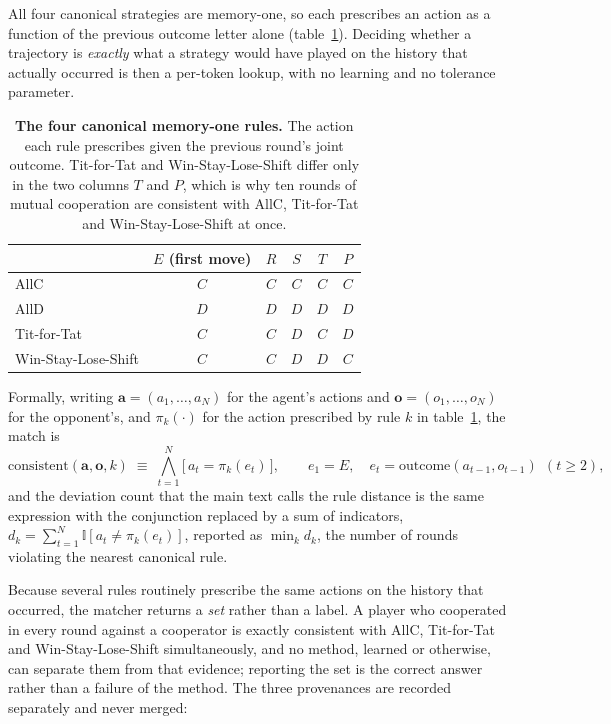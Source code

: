 \documentclass[11pt,a4paper]{article}
\begin{document}
All four canonical strategies are memory-one, so each prescribes an action as a function of the previous outcome letter alone (table~\ref{tab:A-rules}). Deciding whether a trajectory is \emph{exactly} what a strategy would have played on the history that actually occurred is then a per-token lookup, with no learning and no tolerance parameter.

\begin{table}[htbp]
\centering
\footnotesize
\caption{\textbf{The four canonical memory-one rules.} The action each rule prescribes given the previous round's joint outcome. Tit-for-Tat and Win-Stay-Lose-Shift differ only in the two columns $T$ and $P$, which is why ten rounds of mutual cooperation are consistent with AllC, Tit-for-Tat and Win-Stay-Lose-Shift at once.}
\label{tab:A-rules}
\begin{tabular}{@{}lccccc@{}}
\toprule
& $E$ (first move) & $R$ & $S$ & $T$ & $P$ \\
\midrule
AllC & $C$ & $C$ & $C$ & $C$ & $C$ \\
AllD & $D$ & $D$ & $D$ & $D$ & $D$ \\
Tit-for-Tat & $C$ & $C$ & $D$ & $C$ & $D$ \\
Win-Stay-Lose-Shift & $C$ & $C$ & $D$ & $D$ & $C$ \\
\bottomrule
\end{tabular}
\end{table}

Formally, writing $\mathbf{a} = (a_1, \ldots, a_N)$ for the agent's actions and $\mathbf{o} = (o_1, \ldots, o_N)$ for the opponent's, and $\pi_k(\cdot)$ for the action prescribed by rule $k$ in table~\ref{tab:A-rules}, the match is
\[
  \text{consistent}(\mathbf{a}, \mathbf{o}, k)
  \;\equiv\;
  \bigwedge_{t=1}^{N} \bigl[\, a_t = \pi_k(e_t) \,\bigr],
  \qquad
  e_1 = E, \quad
  e_t = \mathrm{outcome}(a_{t-1}, o_{t-1}) \ \ (t \geq 2),
\]
and the deviation count that the main text calls the rule distance is the same expression with the conjunction replaced by a sum of indicators, $d_k = \sum_{t=1}^{N} \mathbb{I}[a_t \neq \pi_k(e_t)]$, reported as $\min_k d_k$, the number of rounds violating the nearest canonical rule.

Because several rules routinely prescribe the same actions on the history that occurred, the matcher returns a \emph{set} rather than a label. A player who cooperated in every round against a cooperator is exactly consistent with AllC, Tit-for-Tat and Win-Stay-Lose-Shift simultaneously, and no method, learned or otherwise, can separate them from that evidence; reporting the set is the correct answer rather than a failure of the method. The three provenances are recorded separately and never merged:
\end{document}
